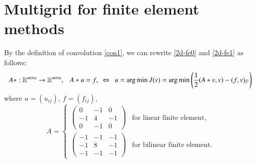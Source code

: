 \section{Multigrid for finite element methods}
By the definition of convolution \eqref{con1}, we can rewrite \eqref{2d-fe0} and \eqref{2d-fe1} as follows: 
\begin{equation}\label{conA}
A\ast:  \mathbb{R}^{m\times n}\rightarrow \mathbb{R}^{m\times n},~~~A\ast u=f,~~\Leftrightarrow~~ u=\operatorname*{arg\,min} J(v)=\operatorname*{arg\,min} \left(\frac{1}{2}(A\ast v,v)-(f,v)_{l^2}\right)
\end{equation}
where $u=(u_{ij})$, $f=(f_{ij})$, 
\begin{equation}\label{fe0_Ka}
A=\left\{
\begin{array}{ll}
	\begin{pmatrix}
	0 &-1&0\\
	-1& 4&-1\\
	0 &-1& 0
	\end{pmatrix}
&\text{for linear finite element,}	\\
	\begin{pmatrix}
	-1 &-1&-1\\
	-1& 8&-1\\
	-1 &-1& -1
	\end{pmatrix}
&\text{for bilinear finite element.}
\end{array}\right.
	\end{equation}

